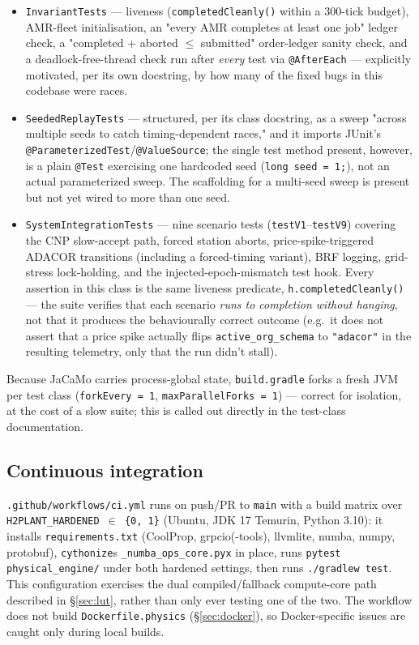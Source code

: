 \documentclass[twocolumn,10pt,a4paper]{article}
\newcommand{\code}[1]{\texttt{\small #1}}
\newcommand{\file}[1]{\texttt{#1}}
\begin{document}
\begin{itemize}
\item \code{InvariantTests} --- liveness (\code{completedCleanly()} within a 300-tick budget), AMR-fleet initialisation, an "every AMR completes at least one job" ledger check, a "completed + aborted $\leq$ submitted" order-ledger sanity check, and a deadlock-free-thread check run after \emph{every} test via \code{@AfterEach} --- explicitly motivated, per its own docstring, by how many of the fixed bugs in this codebase were races.
\item \code{SeededReplayTests} --- structured, per its class docstring, as a sweep "across multiple seeds to catch timing-dependent races," and it imports JUnit's \code{@ParameterizedTest}/\code{@ValueSource}; the single test method present, however, is a plain \code{@Test} exercising one hardcoded seed (\code{long seed = 1;}), not an actual parameterized sweep. The scaffolding for a multi-seed sweep is present but not yet wired to more than one seed.
\item \code{SystemIntegrationTests} --- nine scenario tests (\code{testV1}--\code{testV9}) covering the CNP slow-accept path, forced station aborts, price-spike-triggered ADACOR transitions (including a forced-timing variant), BRF logging, grid-stress lock-holding, and the injected-epoch-mismatch test hook. Every assertion in this class is the same liveness predicate, \code{h.completedCleanly()} --- the suite verifies that each scenario \emph{runs to completion without hanging}, not that it produces the behaviourally correct outcome (e.g.\ it does not assert that a price spike actually flips \code{active\_org\_schema} to \code{"adacor"} in the resulting telemetry, only that the run didn't stall).
\end{itemize}

Because JaCaMo carries process-global state, \file{build.gradle} forks a fresh JVM per test class (\code{forkEvery = 1}, \code{maxParallelForks = 1}) --- correct for isolation, at the cost of a slow suite; this is called out directly in the test-class documentation.

\subsection{Continuous integration}
\label{sec:ci}
\file{.github/workflows/ci.yml} runs on push/PR to \code{main} with a build matrix over \code{H2PLANT\_HARDENED \(\in\) \{0, 1\}} (Ubuntu, JDK 17 Temurin, Python 3.10): it installs \file{requirements.txt} (CoolProp, grpcio(-tools), llvmlite, numba, numpy, protobuf), \code{cythonize}s \file{\_numba\_ops\_core.pyx} in place, runs \code{pytest physical\_engine/} under both hardened settings, then runs \code{./gradlew test}. This configuration exercises the dual compiled/fallback compute-core path described in \S\ref{sec:lut}, rather than only ever testing one of the two. The workflow does not build \file{Dockerfile.physics} (\S\ref{sec:docker}), so Docker-specific issues are caught only during local builds.
\end{document}
